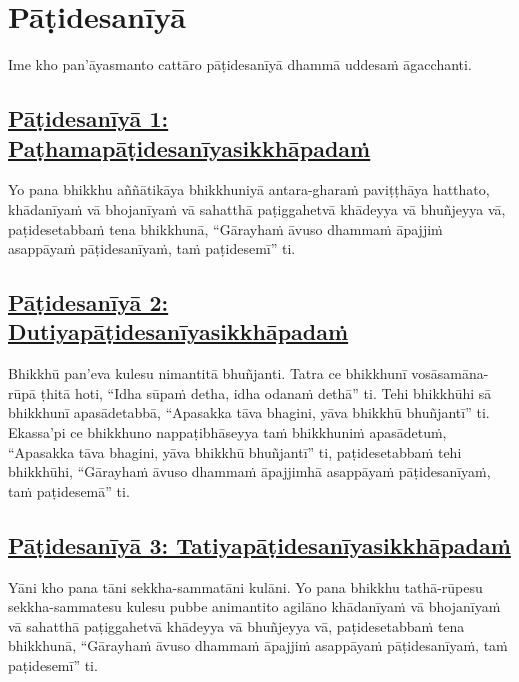 \section{Pāṭidesanīyā}
\label{pd}

\begin{intro}
  Ime kho pan'āyasmanto cattāro pāṭidesanīyā dhammā uddesaṁ āgacchanti.
\end{intro}

\setsubsecheadstyle{\subsubsectionFmt}
\subsection*{\hyperref[ack1]{Pāṭidesanīyā 1: Paṭhamapāṭidesanīyasikkhāpadaṁ}}
\label{pd1}

Yo pana bhikkhu aññātikāya bhikkhuniyā antara-gharaṁ paviṭṭhāya hatthato, khādanīyaṁ vā bhojanīyaṁ vā sahatthā paṭiggahetvā khādeyya vā bhuñjeyya vā, paṭidesetabbaṁ tena bhikkhunā, “Gārayhaṁ āvuso dhammaṁ āpajjiṁ asappāyaṁ pāṭidesanīyaṁ, taṁ paṭidesemī” ti.

\subsection*{\hyperref[ack2]{Pāṭidesanīyā 2: Dutiyapāṭidesanīyasikkhāpadaṁ}}
\label{pd2}

Bhikkhū pan’eva kulesu nimantitā bhuñjanti. Tatra ce bhikkhunī vosāsamāna-rūpā ṭhitā hoti, “Idha sūpaṁ detha, idha odanaṁ dethā” ti. Tehi bhikkhūhi sā bhikkhunī apasādetabbā, “Apasakka tāva bhagini, yāva bhikkhū bhuñjantī” ti. Ekassa’pi ce bhikkhuno nappaṭibhāseyya taṁ bhikkhuniṁ apasādetuṁ, “Apasakka tāva bhagini, yāva bhikkhū bhuñjantī” ti, paṭidesetabbaṁ tehi bhikkhūhi, “Gārayhaṁ āvuso dhammaṁ āpajjimhā asappāyaṁ pāṭidesanīyaṁ, taṁ paṭidesemā” ti.

\subsection*{\hyperref[ack3]{Pāṭidesanīyā 3: Tatiyapāṭidesanīyasikkhāpadaṁ}}
\label{pd3}

Yāni kho pana tāni sekkha-sammatāni kulāni. Yo pana bhikkhu tathā-rūpesu sekkha-sammatesu kulesu pubbe animantito agilāno khādanīyaṁ vā bhojanīyaṁ vā sahatthā paṭiggahetvā khādeyya vā bhuñjeyya vā, paṭidesetabbaṁ tena bhikkhunā, “Gārayhaṁ āvuso dhammaṁ āpajjiṁ asappāyaṁ pāṭidesanīyaṁ, taṁ paṭidesemī” ti.

